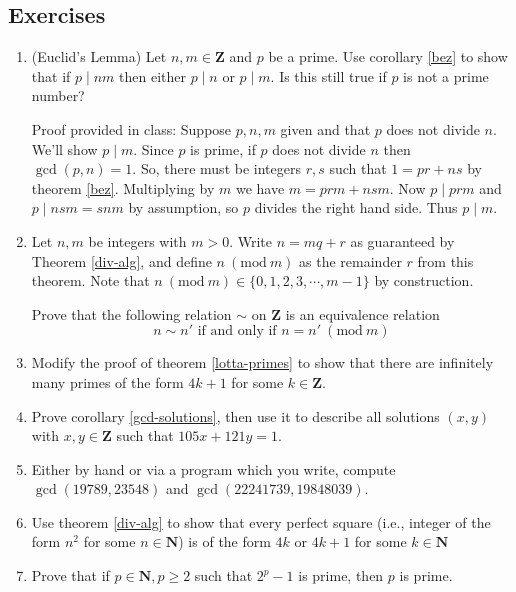 \documentclass[12pt]{article}
\numberwithin{equation}{subsection}
\theoremstyle{note}
\newcommand{\Mod}[1]{\ (\mathrm{mod}\ #1)}
\begin{document}
\subsection{Exercises} \label{nt-ex}
\begin{enumerate}[label=\arabic*.]
	\item (Euclid's Lemma)\label{Euclid-lemma} Let $n,m\in \mathbf{Z}$ and $p$ be a prime. Use corollary \ref{bez} to show that if $p\mid nm$ then either $p\mid n$ or $p\mid m$. Is this still true if $p$ is not a prime number? 
	
		{\color{violet} Proof provided in class: Suppose $p,n,m$ given and that $p$ does not divide $n$. We'll show $p\mid m$. Since $p$ is prime, if $p$ does not divide $n$ then $\gcd(p,n)=1$. So, there must be integers $r,s$ such that $1=pr+ns$ by theorem \ref{bez}. Multiplying by $m$ we have $m=prm+nsm$. Now $p\mid prm$ and $p\mid nsm=snm$ by assumption, so $p$ divides the right hand side. Thus $p\mid m$.}
	
	\item \label{mod-n} Let $n,m$ be integers with $m>0$. Write $n=mq+r$ as guaranteed by Theorem \ref{div-alg}, and define $n\Mod{m}$ as the remainder $r$ from this theorem. Note that $n\Mod{m} \in \{0,1,2,3,\cdots, m-1\}$ by construction. 
	
	Prove  that the following relation $\sim$ on $\mathbf{Z}$ is an equivalence relation \[n\sim n' \text{ if and only if } n=n'\Mod{m}\]
	
	\item Modify the proof of theorem \ref{lotta-primes} to show that there are infinitely many primes of the form $4k+1$ for some $k\in\mathbf{Z}$.
	
	\item Prove corollary \ref{gcd-solutions}, then use it to describe all solutions $(x,y)$ with $x,y\in\mathbf{Z}$ such that $105x+121y=1$. 
	
	\item Either by hand or via a program which you write, compute $\gcd(19789, 23548)$ and $\gcd(22241739, 19848039)$.
	
	\item Use theorem \ref{div-alg} to show that every perfect square (i.e., integer of the form $n^2$ for some $n\in\mathbf{N}$) is of the form $4k$ or $4k+1$ for some $k\in\mathbf{N}$
	
	\item Prove that if $p\in \mathbf{N}, p\geq 2$ such that $2^{p}-1$ is prime, then $p$ is prime. 
	

\end{enumerate}
\end{document}
